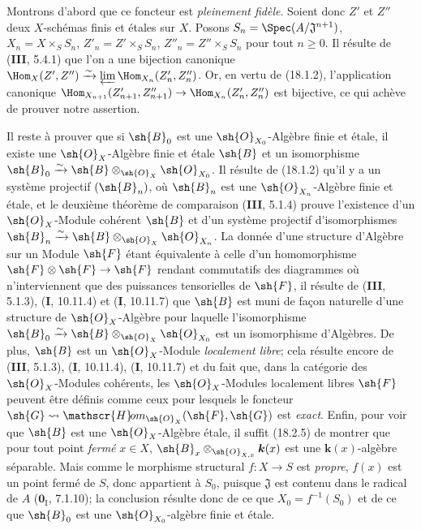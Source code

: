 Montrons d'abord que ce foncteur est \emph{pleinement fidèle}. Soient donc $Z'$ et $Z''$ deux $X$-schémas finis et étales sur $X$. Posons $S_n=\Spec(A/\mathfrak J^{n+1})$, $X_n=X\times_S S_n$, $Z'_n=Z'\times_S S_n$, $Z''_n=Z''\times_S S_n$ pour tout $n\geq 0$. Il résulte de (\textbf{III}, 5.4.1) que l'on a une bijection canonique $\Hom_X(Z',Z'')\xrightarrow{\sim}\varprojlim\Hom_{X_n}(Z'_n,Z''_n)$. Or, en vertu de (18.1.2), l'application canonique $\Hom_{X_{n+1}}(Z'_{n+1},Z''_{n+1})\to\Hom_{X_n}(Z'_n,Z''_n)$ est bijective, ce qui achève de prouver notre assertion.

Il reste à prouver que si $\sh{B}_0$ est une $\sh{O}_{X_0}$-Algèbre finie et étale, il existe une $\sh{O}_X$-Algèbre finie et étale $\sh{B}$ et un isomorphisme $\sh{B}_0\xrightarrow{\sim}\sh{B}\otimes_{\sh{O}_X}\sh{O}_{X_0}$. Il résulte de (18.1.2) qu'il y a un système projectif $(\sh{B}_n)$, où $\sh{B}_n$ est une $\sh{O}_{X_n}$-Algèbre finie et étale, et le deuxième théorème de comparaison (\textbf{III}, 5.1.4) prouve l'existence d'un $\sh{O}_X$-Module cohérent $\sh{B}$ et d'un système projectif d'isomorphismes $\sh{B}_n\xrightarrow{\sim}\sh{B}\otimes_{\sh{O}_X}\sh{O}_{X_n}$. La donnée d'une structure d'Algèbre sur un Module $\sh{F}$ étant équivalente à celle d'un homomorphisme $\sh{F}\otimes\sh{F}\to\sh{F}$ rendant commutatifs des diagrammes où n'interviennent que des puissances tensorielles de $\sh{F}$, il résulte de (\textbf{III}, 5.1.3), (\textbf{I}, 10.11.4) et (\textbf{I}, 10.11.7) que $\sh{B}$ est muni de façon naturelle d'une structure de $\sh{O}_X$-Algèbre pour laquelle l'isomorphisme $\sh{B}_0\xrightarrow{\sim}\sh{B}\otimes_{\sh{O}_X}\sh{O}_{X_0}$ est un isomorphisme d'Algèbres. De plus, $\sh{B}$ est un $\sh{O}_X$-Module \emph{localement libre}; cela résulte encore de (\textbf{III}, 5.1.3), (\textbf{I}, 10.11.4), (\textbf{I}, 10.11.7) et du fait que, dans la catégorie des $\sh{O}_X$-Modules cohérents, les $\sh{O}_X$-Modules localement libres $\sh{F}$ peuvent être définis comme ceux pour lesquels le foncteur $\sh{G}\leadsto\mathscr{H}\!om_{\sh{O}_X}(\sh{F},\sh{G})$ est \emph{exact}. Enfin, pour voir que $\sh{B}$ est une $\sh{O}_X$-Algèbre étale, il suffit (18.2.5) de montrer que pour tout point \emph{fermé} $x\in X$, $\sh{B}_x\otimes_{\sh{O}_{X,x}}\boldsymbol{k}(x)$ est une $\boldsymbol{k}(x)$-algèbre séparable. Mais comme le morphisme structural $f:X\to S$ est \emph{propre}, $f(x)$ est un point fermé de $S$, donc appartient à $S_0$, puisque $\mathfrak J$ est contenu dans le radical de $A$ ($\mathbf{0}_{\mathrm I}$, 7.1.10); la conclusion résulte donc de ce que $X_0=f^{-1}(S_0)$ et de ce que $\sh{B}_0$ est une $\sh{O}_{X_0}$-algèbre finie et étale.

